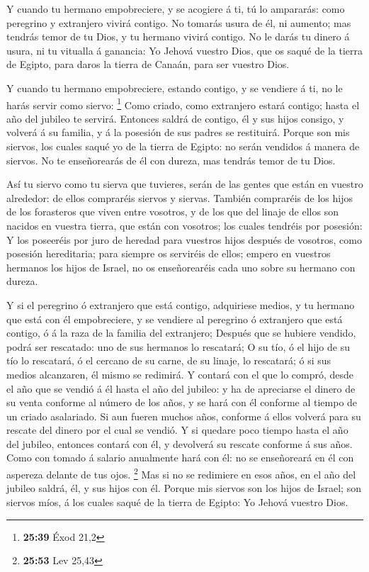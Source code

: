  Y cuando tu hermano empobreciere, y se acogiere á ti, tú
lo ampararás: como peregrino y extranjero vivirá contigo.
 No tomarás usura de él, ni aumento; mas tendrás temor de
tu Dios, y tu hermano vivirá contigo.  No le darás tu
dinero á usura, ni tu vitualla á ganancia:  Yo Jehová
vuestro Dios, que os saqué de la tierra de Egipto, para daros la tierra
de Canaán, para ser vuestro Dios.

 Y cuando tu hermano empobreciere, estando contigo, y se
vendiere á ti, no le harás servir como siervo: \footnote{\textbf{25:39}
  Éxod 21,2}  Como criado, como extranjero estará
contigo; hasta el año del jubileo te servirá.  Entonces
saldrá de contigo, él y sus hijos consigo, y volverá á su familia, y á
la posesión de sus padres se restituirá.  Porque son mis
siervos, los cuales saqué yo de la tierra de Egipto: no serán vendidos á
manera de siervos.  No te enseñorearás de él con dureza,
mas tendrás temor de tu Dios.

 Así tu siervo como tu sierva que tuvieres, serán de las
gentes que están en vuestro alrededor: de ellos compraréis siervos y
siervas.  También compraréis de los hijos de los
forasteros que viven entre vosotros, y de los que del linaje de ellos
son nacidos en vuestra tierra, que están con vosotros; los cuales
tendréis por posesión:  Y los poseeréis por juro de
heredad para vuestros hijos después de vosotros, como posesión
hereditaria; para siempre os serviréis de ellos; empero en vuestros
hermanos los hijos de Israel, no os enseñorearéis cada uno sobre su
hermano con dureza.

 Y si el peregrino ó extranjero que está contigo,
adquiriese medios, y tu hermano que está con él empobreciere, y se
vendiere al peregrino ó extranjero que está contigo, ó á la raza de la
familia del extranjero;  Después que se hubiere vendido,
podrá ser rescatado: uno de sus hermanos lo rescatará;  O
su tío, ó el hijo de su tío lo rescatará, ó el cercano de su carne, de
su linaje, lo rescatará; ó si sus medios alcanzaren, él mismo se
redimirá.  Y contará con el que lo compró, desde el año
que se vendió á él hasta el año del jubileo: y ha de apreciarse el
dinero de su venta conforme al número de los años, y se hará con él
conforme al tiempo de un criado asalariado.  Si aun
fueren muchos años, conforme á ellos volverá para su rescate del dinero
por el cual se vendió.  Y si quedare poco tiempo hasta el
año del jubileo, entonces contará con él, y devolverá su rescate
conforme á sus años.  Como con tomado á salario
anualmente hará con él: no se enseñoreará en él con aspereza delante de
tus ojos. \footnote{\textbf{25:53} Lev 25,43}  Mas si no
se redimiere en esos años, en el año del jubileo saldrá, él, y sus hijos
con él.  Porque mis siervos son los hijos de Israel; son
siervos míos, á los cuales saqué de la tierra de Egipto: Yo Jehová
vuestro Dios.

